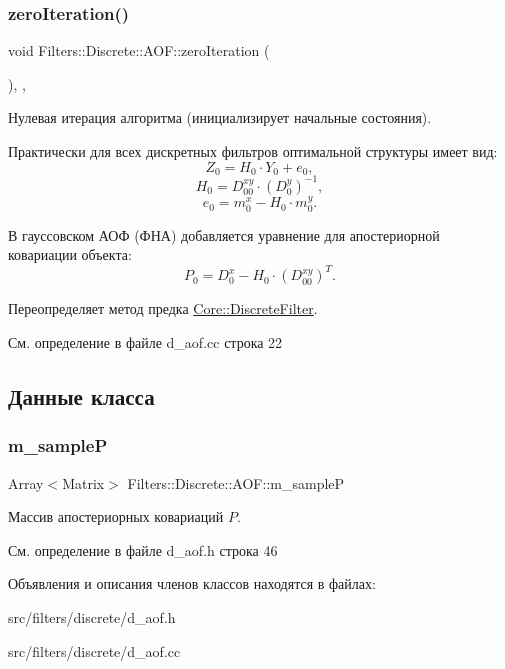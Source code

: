 \subsubsection{\texorpdfstring{zero\+Iteration()}{zeroIteration()}}
{\footnotesize\ttfamily void Filters\+::\+Discrete\+::\+A\+O\+F\+::zero\+Iteration (\begin{DoxyParamCaption}{ }\end{DoxyParamCaption})\hspace{0.3cm}{\ttfamily [override]}, {\ttfamily [protected]}, {\ttfamily [virtual]}}



Нулевая итерация алгоритма (инициализирует начальные состояния). 

Практически для всех дискретных фильтров оптимальной структуры имеет вид\+: \[Z_0 = H_0 \cdot Y_0 + e_0,\] \[H_0 = D_{00}^{xy} \cdot (D_0^y)^{-1},\] \[e_0 = m_0^x - H_0 \cdot m_0^y.\]

В гауссовском АОФ (ФНА) добавляется уравнение для апостериорной ковариации объекта\+: \[P_0 = D_0^x - H_0 \cdot (D_{00}^{xy})^T.\] 

Переопределяет метод предка \hyperlink{class_core_1_1_discrete_filter_a658617c64c7067bb6b98b5e9d78f982e}{Core\+::\+Discrete\+Filter}.



См. определение в файле d\+\_\+aof.\+cc строка 22



\subsection{Данные класса}
\hypertarget{class_filters_1_1_discrete_1_1_a_o_f_aef55ce0cf7129bb7090f8e470bcfbc1f}{}\label{class_filters_1_1_discrete_1_1_a_o_f_aef55ce0cf7129bb7090f8e470bcfbc1f} 
\subsubsection{\texorpdfstring{m\+\_\+sampleP}{m\_sampleP}}
{\footnotesize\ttfamily Array$<$Matrix$>$ Filters\+::\+Discrete\+::\+A\+O\+F\+::m\+\_\+sampleP\hspace{0.3cm}{\ttfamily [protected]}}

Массив апостериорных ковариаций $P$. 

См. определение в файле d\+\_\+aof.\+h строка 46



Объявления и описания членов классов находятся в файлах\+:\begin{DoxyCompactItemize}
\item 
src/filters/discrete/d\+\_\+aof.\+h\item 
src/filters/discrete/d\+\_\+aof.\+cc\end{DoxyCompactItemize}
